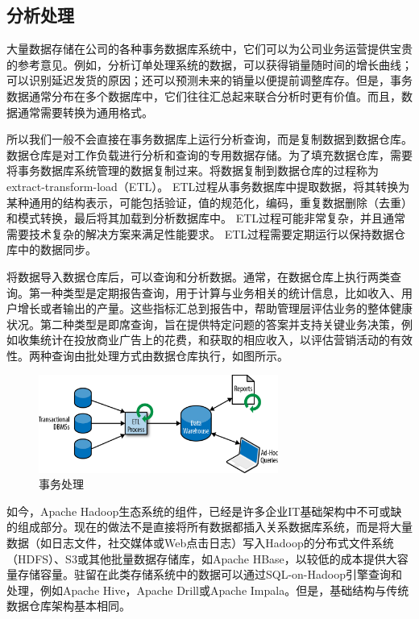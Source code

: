 \documentclass[cn,11pt,chinese]{elegantbook}
\begin{document}
\subsection{分析处理}

大量数据存储在公司的各种事务数据库系统中，它们可以为公司业务运营提供宝贵的参考意见。例如，分析订单处理系统的数据，可以获得销量随时间的增长曲线；可以识别延迟发货的原因；还可以预测未来的销量以便提前调整库存。但是，事务数据通常分布在多个数据库中，它们往往汇总起来联合分析时更有价值。而且，数据通常需要转换为通用格式。

所以我们一般不会直接在事务数据库上运行分析查询，而是复制数据到数据仓库。数据仓库是对工作负载进行分析和查询的专用数据存储。为了填充数据仓库，需要将事务数据库系统管理的数据复制过来。将数据复制到数据仓库的过程称为extract-transform-load（ETL）。 ETL过程从事务数据库中提取数据，将其转换为某种通用的结构表示，可能包括验证，值的规范化，编码，重复数据删除（去重）和模式转换，最后将其加载到分析数据库中。 ETL过程可能非常复杂，并且通常需要技术复杂的解决方案来满足性能要求。 ETL过程需要定期运行以保持数据仓库中的数据同步。

将数据导入数据仓库后，可以查询和分析数据。通常，在数据仓库上执行两类查询。第一种类型是定期报告查询，用于计算与业务相关的统计信息，比如收入、用户增长或者输出的产量。这些指标汇总到报告中，帮助管理层评估业务的整体健康状况。第二种类型是即席查询，旨在提供特定问题的答案并支持关键业务决策，例如收集统计在投放商业广告上的花费，和获取的相应收入，以评估营销活动的有效性。两种查询由批处理方式由数据仓库执行，如图所示。

\begin{figure}[htbp]
  \centering
  \includegraphics[width=0.7\textwidth]{images/spaf_0103.png}
  \caption{事务处理}
\end{figure}

如今，Apache Hadoop生态系统的组件，已经是许多企业IT基础架构中不可或缺的组成部分。现在的做法不是直接将所有数据都插入关系数据库系统，而是将大量数据（如日志文件，社交媒体或Web点击日志）写入Hadoop的分布式文件系统（HDFS）、S3或其他批量数据存储库，如Apache HBase，以较低的成本提供大容量存储容量。驻留在此类存储系统中的数据可以通过SQL-on-Hadoop引擎查询和处理，例如Apache Hive，Apache Drill或Apache Impala。但是，基础结构与传统数据仓库架构基本相同。
\end{document}
